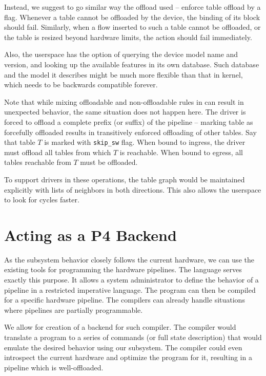 Instead, we suggest to go similar way the  offload used -- enforce
table offload by a flag. Whenever a table cannot be offloaded by the device,
the binding of its block should fail. Similarly, when a flow inserted to such
a table cannot be offloaded, or the table is resized beyond hardware limits, the
action should fail immediately.

Also, the userspace has the option of querying the device model name and
version, and looking up the available features in its own database. Such database
and the model it describes might be much more flexible than that in kernel,
which needs to be backwards compatible forever.

Note that while mixing offloadable and non-offloadable rules in  can
result in unexpected behavior, the same situation does not happen here. The driver is
forced to offload a complete prefix (or suffix) of the pipeline -- marking table as forcefully
offloaded results in transitively enforced offloading of other tables. Say that
table $T$ is marked with \texttt{skip\_sw} flag. When bound to ingress, the
driver must offload all tables from which $T$ is reachable. When bound to
egress, all tables reachable from $T$ must be offloaded.

To support drivers in these operations, the table graph would be maintained
explicitly with lists of neighbors in both directions. This also allows the
userspace to look for cycles faster.

\section{Acting as a P4 Backend}

As the subsystem behavior closely follows the current hardware, we can use the existing
tools for programming the hardware pipelines. The  language serves exactly
this purpose. It allows a system administrator to define the behavior of
a pipeline in a restricted imperative language. The program can then be compiled
for a specific hardware pipeline. The compilers can already handle situations
where pipelines are partially programmable.

We allow for creation of a backend for such compiler. The compiler would
translate a  program to a series of commands (or full state description) that
would emulate the desired behavior using our subsystem. The compiler could even
introspect the current hardware and optimize the program for it, resulting in
a pipeline which is well-offloaded.

